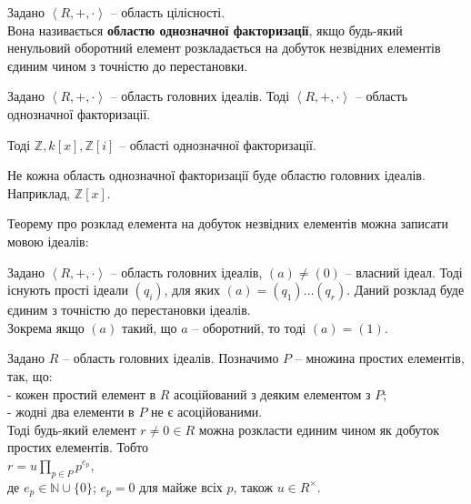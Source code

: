 \documentclass{math_library}
\begin{document}
\begin{definition}
Задано $\left< R,+,\cdot\right>$ -- область цілісності.\\
Вона називається \textbf{областю однозначної факторизації}, якщо будь-який ненульовий оборотний елемент розкладається на добуток незвідних елементів єдиним чином з точністю до перестановки.
\end{definition}

\begin{theorem}
Задано $\left< R,+,\cdot\right>$ -- область головних ідеалів. Тоді $\left< R,+,\cdot\right>$ -- область однозначної факторизації.
\end{theorem}

\begin{example}
Тоді $\mathbb{Z}, k[x], \mathbb{Z}[i]$ -- області однозначної факторизації.
\end{example}

\begin{remark}
Не кожна область однозначної факторизації буде областю головних ідеалів. Наприклад, $\mathbb{Z}[x]$.
\end{remark}

Теорему про розклад елемента на добуток незвідних елементів можна записати мовою ідеалів:
\begin{theorem}
Задано $\left< R,+,\cdot \right>$ -- область головних ідеалів, $(a) \neq (0)$ -- власний ідеал. Тоді існують прості ідеали $(q_i)$, для яких $(a) = (q_1) \dots (q_r)$. Даний розклад буде єдиним з точністю до перестановки ідеалів.\\
Зокрема якщо $(a)$ такий, що $a$ -- оборотний, то тоді $(a) = (1)$.
\end{theorem}

\begin{theorem}
Задано $R$ -- область головних ідеалів. Позначимо $P$ -- множина простих елементів, так, що:\\
- кожен простий елемент в $R$ асоційований з деяким елементом з $P$;\\
- жодні два елементи в $P$ не є асоційованими.\\
Тоді будь-який елемент $r \neq 0 \in R$ можна розкласти единим чином як добуток простих елементів. Тобто\\
$r = u \displaystyle\prod_{p \in P} p^{e_p}$,\\
де $e_p \in \mathbb{N} \cup \{0\}$; $e_p = 0$ для майже всіх $p$, також $u \in R^\times$.
\end{theorem}
\end{document}

